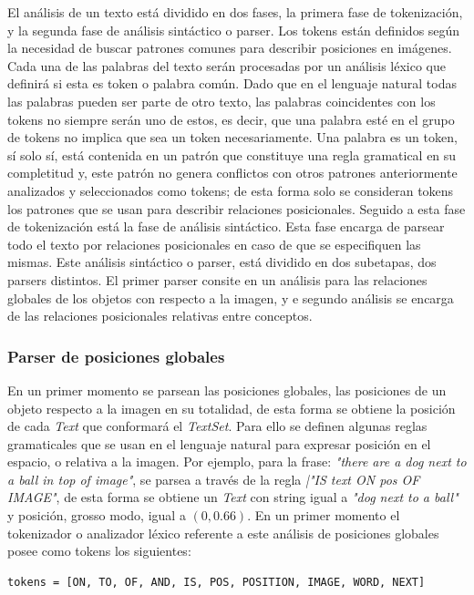El análisis de un texto está dividido en dos fases, la primera fase de tokenización, y la segunda fase de análisis sintáctico o parser. Los tokens están definidos según la necesidad de buscar patrones comunes para describir posiciones en imágenes. Cada una de las palabras del texto serán procesadas por un análisis léxico que definirá si esta es token o palabra común. Dado que en el lenguaje natural todas las palabras pueden ser parte de otro texto, las palabras coincidentes con los tokens no siempre serán uno de estos, es decir, que una palabra esté en el grupo de tokens no implica que sea un token necesariamente. Una palabra es un token, s\'i solo s\'i, está contenida en un patrón que constituye una regla gramatical en su completitud y, este patr\'on no genera conflictos con otros patrones anteriormente analizados y seleccionados como tokens; de esta forma solo se consideran tokens los patrones que se usan para describir relaciones posicionales. 
Seguido a esta fase de tokenización est\'a la fase de análisis sintáctico. Esta fase encarga de parsear todo el texto por relaciones posicionales en caso de que se especifiquen las mismas. Este análisis sint\'actico o parser, está dividido en dos subetapas, dos parsers distintos. El primer parser consite en un análisis para las relaciones globales de los objetos con respecto a la imagen, y e segundo análisis se encarga de las relaciones posicionales relativas entre conceptos.

\subsubsection*{Parser de posiciones globales}

En un primer momento se parsean las posiciones globales, las posiciones de un objeto respecto a la imagen en su totalidad, de esta forma se obtiene la posición de cada \textit{Text} que conformará el \textit{TextSet}. Para ello se definen algunas reglas gramaticales que se usan en el lenguaje natural para expresar posición en el espacio, o relativa a la imagen. Por ejemplo, para la frase: \textit{"there are a dog next to a ball in top of image"}, se parsea a través de la regla \textit{|"IS text ON pos OF IMAGE"}, de esta forma se obtiene un \textit{Text} con string igual a \textit{"dog next to a ball"} y posici\'on, grosso modo, igual a $(0, 0.66)$. En un primer momento el tokenizador o analizador léxico referente a este análisis de posiciones globales posee como tokens los siguientes:

\begin{verbatim}
tokens = [ON, TO, OF, AND, IS, POS, POSITION, IMAGE, WORD, NEXT]
\end{verbatim}

